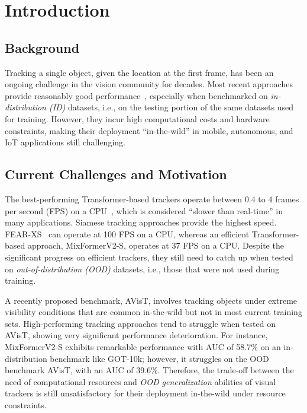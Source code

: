 
\chapter{Introduction} %

\label{Chapter1} %


\section{Background}

Tracking a single object, given the location at the first frame, has been an ongoing challenge in the vision community for decades. Most recent approaches provide reasonably good performance~\cite{gao2022aiatrack,he2023target,yan2021learning,wei2023autoregressive,chen2023seqtrack}, especially when benchmarked on \emph{in-distribution (ID)} datasets, i.e., on the testing portion of the same datasets used for training. However, they incur high computational costs and hardware constraints, making their deployment ``in-the-wild'' in mobile, autonomous, and IoT applications still challenging.


\section{Current Challenges and Motivation}

The best-performing Transformer-based trackers operate between 0.4 to 4 frames per second (FPS) on a CPU~\cite{chen2023seqtrack,wu2023dropmae}, which is considered ``slower than real-time'' in many applications. Siamese tracking approaches provide the highest speed. FEAR-XS~\cite{borsuk2022fear} can operate at 100 FPS on a CPU, whereas an efficient Transformer-based approach, MixFormerV2-S\cite{cui2024mixformerv2}, operates at 37 FPS on a CPU. Despite the significant progress on efficient trackers, they still need to catch up when tested on \emph{out-of-distribution (OOD)} datasets, i.e., those that were not used during training.

A recently proposed benchmark, AVisT\cite{noman2022avist}, involves tracking objects under extreme visibility conditions that are common in-the-wild but not in most current training sets. High-performing tracking approaches tend to struggle when tested on AVisT, showing very significant performance deterioration. For instance, MixFormerV2-S exhibits remarkable performance with AUC of 58.7\% on an in-distribution benchmark like GOT-10k\cite{Huang2021}; however, it struggles on the OOD benchmark AVisT, with an AUC of 39.6\%. Therefore, the trade-off between the need of computational resources and \emph{OOD generalization} abilities of visual trackers is still unsatisfactory for their deployment in-the-wild under resource constraints.  


